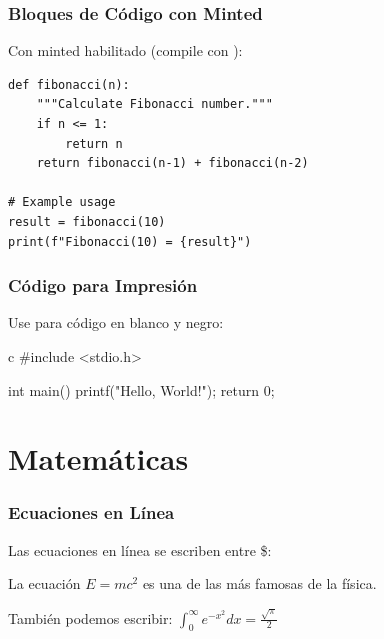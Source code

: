 \documentclass{pt-slides}
\begin{document}
\begin{frame}[fragile]
    \frametitle{Bloques de Código con Minted}

    Con minted habilitado (compile con ):

    \vspace{0.3cm}

    \begin{verbatim}
def fibonacci(n):
    """Calculate Fibonacci number."""
    if n <= 1:
        return n
    return fibonacci(n-1) + fibonacci(n-2)

# Example usage
result = fibonacci(10)
print(f"Fibonacci(10) = {result}")
    \end{verbatim}
\end{frame}

\begin{frame}[fragile]
    \frametitle{Código para Impresión}

    Use  para código en blanco y negro:

    \vspace{0.3cm}

    \begin{ptprintcode}{c}
        #include <stdio.h>

        int main() {
                printf("Hello, World!\n");
                return 0;
            }
    \end{ptprintcode}
\end{frame}

\section{Matemáticas}

\begin{frame}
    \frametitle{Ecuaciones en Línea}

    Las ecuaciones en línea se escriben entre \$:

    \vspace{0.5cm}

    La ecuación $E = mc^2$ es una de las más famosas de la física.

    \vspace{0.5cm}

    También podemos escribir: $\int_{0}^{\infty} e^{-x^2} dx = \frac{\sqrt{\pi}}{2}$
\end{frame}
\end{document}
